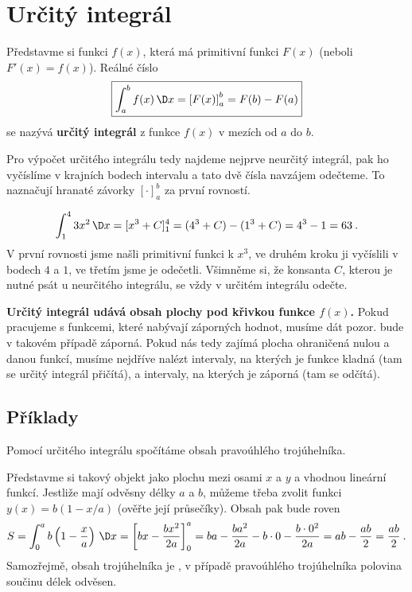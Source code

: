 \section{Určitý integrál}

Představme si funkci $f(x)$, která má primitivní funkci $F(x)$ (neboli $F'(x)=f(x)$). Reálné číslo \begin{align}
    \boxed{
    \int_a^b f(x) \, \D x = \left[ F(x) \right]_a^b = F(b)-F(a)
    }
\end{align}
se nazývá \textbf{určitý integrál} z funkce $f(x)$ v mezích od $a$ do $b$. 

Pro výpočet určitého integrálu tedy najdeme nejprve neurčitý integrál, pak ho vyčíslíme v krajních bodech intervalu a tato dvě čísla navzájem odečteme. To naznačují hranaté závorky $[\cdot]_a^b$ za první rovností.

\begin{example}
    \begin{align}
        \int_1^4 3 x^2 \, \D x = [x^3 + C]_1^4 = (4^3 + C)- (1^3 + C) = 4^3 - 1 = 63 \:.
    \end{align}
    V první rovnosti jsme našli primitivní funkci k $x^3$, ve druhém kroku ji vyčíslili v bodech $4$ a $1$, ve třetím jsme je odečetli. Všimněme si, že konsanta $C$, kterou je nutné psát u neurčitého integrálu, se vždy v určitém integrálu odečte.
\end{example}

\textbf{Určitý integrál udává obsah plochy pod křivkou funkce $f(x)$.}
Pokud pracujeme s funkcemi, které nabývají záporných hodnot, musíme dát pozor.  bude v takovém případě záporná. Pokud nás tedy zajímá plocha ohraničená nulou a danou funkcí, musíme nejdříve nalézt intervaly, na kterých je funkce kladná (tam se určitý integrál přičítá), a intervaly, na kterých je záporná (tam se odčítá).

\subsection*{Příklady}

\begin{example}
    Pomocí určitého integrálu spočítáme obsah pravoúhlého trojúhelníka. 
    
    Představme si takový objekt jako plochu mezi osami $x$ a $y$ a vhodnou lineární funkcí. Jestliže mají odvěsny délky $a$ a $b$, můžeme třeba zvolit funkci $y(x) = b(1-x/a)$ (ověřte její průsečíky). Obsah pak bude roven \begin{align}
        S = \int_0^a b\left(1-\frac{x}{a}\right) \, \D x = \left[ bx - \frac{bx^2}{2a} \right]_0^a =  ba - \frac{ba^2}{2a} - b \cdot 0 - \frac{b \cdot 0^2}{2a} = ab - \frac{ab}{2} = \frac{ab}{2} \:.
    \end{align}
    Samozřejmě, obsah trojúhelníka je , v případě pravoúhlého trojúhelníka polovina součinu délek odvěsen.
\end{example}

